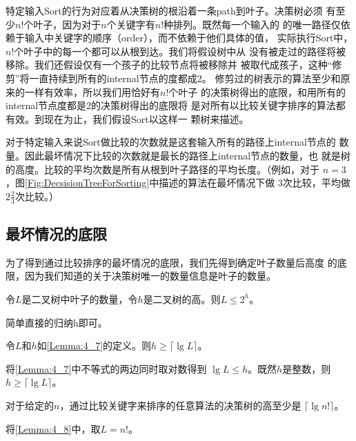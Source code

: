 特定输入Sort的行为对应着从决策树的根沿着一条path到叶子。决策树必须
有至少$n!$个叶子，因为对于$n$个关键字有$n!$种排列。既然每一个输入的
的唯一路径仅依赖于输入中关键字的顺序（order），而不依赖于他们具体的值，
实际执行Sort中，$n!$个叶子中的每一个都可以从根到达。我们将假设树中从
没有被走过的路径将被移除。我们还假设仅有一个孩子的比较节点将被移除并
被取代成孩子，这种“修剪”将一直持续到所有的internal节点的度都成2。
修剪过的树表示的算法至少和原来的一样有效率，所以我们用恰好有$n!$个叶子
的决策树得出的底限，和用所有的internal节点度都是2的决策树得出的底限将
是对所有以比较关键字排序的算法都有效。到现在为止，我们假设Sort以这样一
颗树来描述。

对于特定输入来说Sort做比较的次数就是这套输入所有的路径上internal节点的
数量。因此最坏情况下比较的次数就是最长的路径上internal节点的数量，也
就是树的高度。比较的平均次数是所有从根到叶子路径的平均长度。（例如，对于
$n=3$，图\ref{Fig:DecsisionTreeForSorting}中描述的算法在最坏情况下做
3次比较，平均做$2\frac{2}{3}$次比较。）

\subsection{最坏情况的底限}\label{Sec:LowerBoundOfWorstCase}
为了得到通过比较排序的最坏情况的底限，我们先得到确定叶子数量后高度
的底限，因为我们知道的关于决策树唯一的数量信息是叶子的数量。

\begin{lemma}\label{Lemma:4_7}
令$L$是二叉树中叶子的数量，令$h$是二叉树的高。则$L\leq 2^h$。

简单直接的归纳h即可。
\end{lemma}

\begin{lemma}\label{Lemma:4_8}
令$L$和$h$如\ref{Lemma:4_7}的定义。则$h\geq \lceil\lg L\rceil$。

将\ref{Lemma:4_7}中不等式的两边同时取对数得到
$\lg L \leq h$。既然$h$是整数，则$h\geq \lceil \lg L\rceil$。
\end{lemma}

\begin{lemma}\label{Lemma:4_9}
对于给定的$n$，通过比较关键字来排序的任意算法的决策树的高至少是
$\lceil\lg n!\rceil$。

将\ref{Lemma:4_8}中，取$L= n!$。
\end{lemma}

